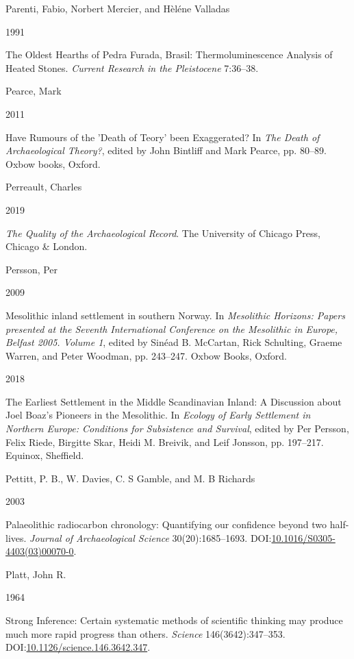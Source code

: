 \documentclass[
  12pt,
  a4paper,
  oneside]{book}
\newlength{\cslhangindent}
\newlength{\csllabelwidth}
\newlength{\cslentryspacingunit} %
\newenvironment{CSLReferences}[2] %
 {%
  \setlength{\parindent}{0pt}
  \ifodd #1
  \let\oldpar\par
  \def\par{\hangindent=\cslhangindent\oldpar}
  \fi
  \setlength{\parskip}{#2\cslentryspacingunit}
 }%
 {}
\newcommand{\CSLBlock}[1]{#1\hfill\break}
\newcommand{\CSLLeftMargin}[1]{\parbox[t]{\csllabelwidth}{#1}}
\newcommand{\CSLRightInline}[1]{\parbox[t]{\linewidth - \csllabelwidth}{#1}\break}
\begin{document}
\begin{CSLReferences}{0}{0}
\leavevmode{}%
\CSLBlock{Parenti, Fabio, Norbert Mercier, and Hèléne Valladas}
\CSLLeftMargin{ 1991}
\CSLRightInline{The Oldest Hearths of Pedra Furada, Brasil: Thermoluminescence Analysis of Heated Stones. \emph{Current Research in the Pleistocene} 7:36--38.}

\leavevmode{}%
\CSLBlock{Pearce, Mark}
\CSLLeftMargin{ 2011}
\CSLRightInline{{Have Rumours of the 'Death of Teory' been Exaggerated?} In \emph{{The Death of Archaeological Theory?}}, edited by John Bintliff and Mark Pearce, pp. 80--89. Oxbow books, Oxford.}

\leavevmode{}%
\CSLBlock{Perreault, Charles}
\CSLLeftMargin{ 2019}
\CSLRightInline{\emph{{The Quality of the Archaeological Record}}. The University of Chicago Press, Chicago \& London.}

\leavevmode{}%
\CSLBlock{Persson, Per}
\CSLLeftMargin{ 2009}
\CSLRightInline{{Mesolithic inland settlement in southern Norway}. In \emph{{Mesolithic Horizons: Papers presented at the Seventh International Conference on the Mesolithic in Europe, Belfast 2005. Volume 1}}, edited by Sinéad B. McCartan, Rick Schulting, Graeme Warren, and Peter Woodman, pp. 243--247. Oxbow Books, Oxford.}

\leavevmode{}%
\CSLLeftMargin{ 2018 }
\CSLRightInline{{The Earliest Settlement in the Middle Scandinavian Inland: A Discussion about Joel Boaz's Pioneers in the Mesolithic}. In \emph{{Ecology of Early Settlement in Northern Europe: Conditions for Subsistence and Survival}}, edited by Per Persson, Felix Riede, Birgitte Skar, Heidi M. Breivik, and Leif Jonsson, pp. 197--217. Equinox, Sheffield.}

\leavevmode{}%
\CSLBlock{Pettitt, P. B., W. Davies, C. S Gamble, and M. B Richards}
\CSLLeftMargin{ 2003}
\CSLRightInline{Palaeolithic radiocarbon chronology: Quantifying our confidence beyond two half-lives. \emph{Journal of Archaeological Science} 30(20):1685--1693. DOI:\href{https://doi.org/10.1016/S0305-4403(03)00070-0}{10.1016/S0305-4403(03)00070-0}.}

\leavevmode{}%
\CSLBlock{Platt, John R.}
\CSLLeftMargin{ 1964}
\CSLRightInline{{Strong Inference: Certain systematic methods of scientific thinking may produce much more rapid progress than others}. \emph{Science} 146(3642):347--353. DOI:\href{https://doi.org/10.1126/science.146.3642.347}{10.1126/science.146.3642.347}.}


\end{CSLReferences}
\end{document}
